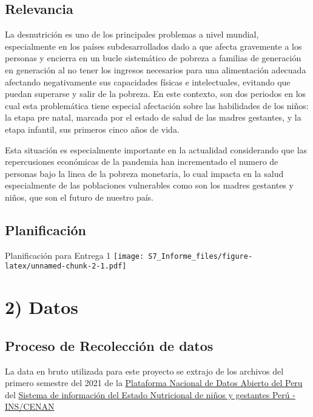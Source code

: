 \documentclass[
]{article}
\begin{document}
\hypertarget{relevancia}{%
\subsection{Relevancia}\label{relevancia}}

La desnutrición es uno de los principales problemas a nivel mundial,
especialmente en los países subdesarrollados dado a que afecta
gravemente a los personas y encierra en un bucle sistemático de pobreza
a familias de generación en generación al no tener los ingresos
necesarios para una alimentación adecuada afectando negativamente sus
capacidades físicas e intelectuales, evitando que puedan superarse y
salir de la pobreza. En este contexto, son dos periodos en los cual esta
problemática tiene especial afectación sobre las habilidades de los
niños: la etapa pre natal, marcada por el estado de salud de las madres
gestantes, y la etapa infantil, sus primeros cinco años de vida.

Esta situación es especialmente importante en la actualidad considerando
que las repercusiones económicas de la pandemia han incrementado el
numero de personas bajo la linea de la pobreza monetaria, lo cual
impacta en la salud especialmente de las poblaciones vulnerables como
son los madres gestantes y niños, que son el futuro de nuestro país.

\hypertarget{planificaciuxf3n}{%
\subsection{Planificación}\label{planificaciuxf3n}}

Planificación para Entrega 1
\texttt{[image: S7\_Informe\_files/figure-latex/unnamed-chunk-2-1.pdf]}

\hypertarget{datos}{%
\section{2) Datos}\label{datos}}

\hypertarget{proceso-de-recolecciuxf3n-de-datos}{%
\subsection{Proceso de Recolección de
datos}\label{proceso-de-recolecciuxf3n-de-datos}}

La data en bruto utilizada para este proyecto se extrajo de los archivos
del primero semestre del 2021 de la
\href{https://www.datosabiertos.gob.pe/}{Plataforma Nacional de Datos
Abierto del Peru} del
\href{https://www.datosabiertos.gob.pe/dataset/sistema-de-informaci\%C3\%B3n-del-estado-nutricional-de-ni\%C3\%B1os-y-gestantes-per\%C3\%BA-inscenan-instituto}{Sistema
de información del Estado Nutricional de niños y gestantes Perú -
INS/CENAN}
\end{document}
